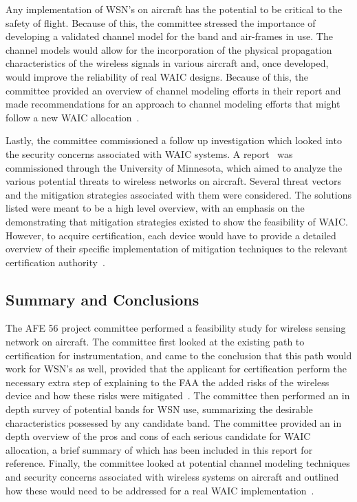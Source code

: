 Any implementation of WSN's on aircraft has the potential to be critical to the safety of flight. Because of this, the committee stressed the importance of  developing a validated channel model for the band and air-frames in use. The channel models would allow for the incorporation of the physical propagation characteristics of the wireless signals in various aircraft and, once developed, would improve the reliability of real WAIC designs. Because of this, the committee provided an overview of channel modeling efforts in their report and made recommendations for an approach to channel modeling efforts that might follow a new WAIC allocation~\cite{ferrell_feasibility_2007}. 

Lastly, the committee commissioned a follow up investigation which looked into the security concerns associated with WAIC systems. A report~\cite{tewfik_university_2009} was commissioned through the University of Minnesota, which aimed to analyze the various potential threats to wireless networks on aircraft. Several threat vectors and the mitigation strategies associated with them were considered. The solutions listed were meant to be a high level overview, with an emphasis on the demonstrating that mitigation strategies existed to show  the feasibility of WAIC. However, to acquire certification, each device would have to provide a detailed overview of their specific implementation of mitigation techniques to the relevant certification authority~\cite{tewfik_university_2009}. 

\subsection{Summary and Conclusions}
The AFE 56 project committee performed a feasibility study for wireless sensing network on aircraft. The committee first looked at the existing path to certification for instrumentation, and came to the conclusion that this path would work for WSN's as well, provided that the applicant for certification perform the necessary extra step of explaining to the FAA the added risks of the wireless device and how these risks were mitigated~\cite{ferrell_feasibility_2007}. The committee then performed an in depth survey of potential bands for WSN use, summarizing the desirable characteristics possessed by any candidate band. The committee provided an in depth overview of the pros and cons of each serious candidate for WAIC allocation, a brief summary of which has been included in this report for reference. Finally, the  committee looked at potential channel modeling techniques and security concerns associated with wireless systems on aircraft and outlined how these would need to be addressed for a real WAIC implementation~\cite{tewfik_university_2009}. 

